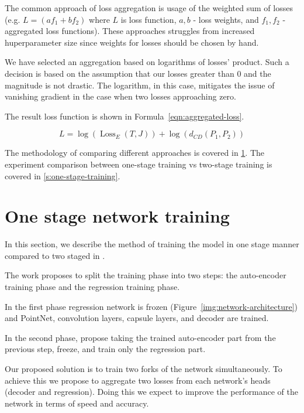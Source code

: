 The common approach of loss aggregation is usage of the weighted sum of losses \parencite{redmon_you_2016,cipolla_multi-task_2018,zhao_loss_2018} (e.g. $L = (af_1+bf_2)$ where $L$ is loss function, $a, b$ - loss weights, and $f_1, f_2$ - aggregated loss functions). These approaches struggles from increased huperparameter size since weights for losses should be chosen by hand.

We have selected an aggregation based on logarithms of losses' product. Such a decision is based on the assumption that our losses greater than $0$ and the magnitude is not drastic. The logarithm, in this case, mitigates the issue of vanishing gradient in the case when two losses approaching zero.

The result loss function is shown in Formula~\ref{eqn:aggregated-loss}.

\begin{equation}
    L = \log{(\operatorname{Loss}_{E}(T, J))} + \log{( d_{C D}\left(P_{1}, P_{2}\right))}
\label{eqn:aggregated-loss}
\end{equation}

The methodology of comparing different approaches is covered in \ref{s:one-stage-network-training}. The experiment comparison between one-stage training vs two-stage training is covered in \ref{s:one-stage-training}.

\section{One stage network training}
\label{s:one-stage-network-training}
In this section, we describe the method of training the model in one stage manner compared to two staged in \cite{wu_3d_2020}.

The work \cite{wu_3d_2020} proposes to split the training phase into two steps: the auto-encoder training phase and the regression training phase.

In the first phase regression network is frozen (Figure~\ref{img:network-architecture}) and PointNet, convolution layers, capsule layers, and decoder are trained. 

In the second phase, \cite{wu_3d_2020} propose taking the trained auto-encoder part from the previous step, freeze, and train only the regression part.

Our proposed solution is to train two forks of the network simultaneously. To achieve this we propose to aggregate two losses from each network's heads (decoder and regression). Doing this we expect to improve the performance of the network in terms of speed and accuracy.

